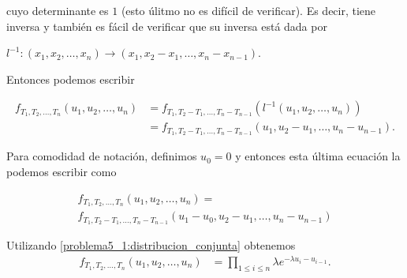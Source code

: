 cuyo determinante es $1$ (esto úlitmo no es difícil de verificar). Es decir, tiene inversa y también es fácil de verificar que 
su inversa está dada por\par $l^{-1}: (x_1, x_2, \dots, x_n) \longrightarrow (x_1, x_2-x_1, \dots, x_n - x_{n-1})$.\pn

Entonces podemos escribir

\begin{align}
    f_{T_1, T_2, \dots, T_n}(u_1, u_2, \dots, u_n)  &=  f_{T_1, T_2 - T_1, \dots, T_n - T_{n-1}}(l^{-1}(u_1, u_2, \dots, u_n))      \\
                                                    &=  f_{T_1, T_2 - T_1, \dots, T_n - T_{n-1}}(u_1, u_2-u_1, \dots, u_n - u_{n-1}).
\end{align}\pn

Para comodidad de notación, definimos $u_0 = 0$ y entonces esta última ecuación la podemos escribir como

\begin{align}
    f_{T_1, T_2, \dots, T_n}(u_1, u_2, \dots, u_n) =                                    \\  
    f_{T_1, T_2 - T_1, \dots, T_n - T_{n-1}}(u_1 - u_0, u_2-u_1, \dots, u_n - u_{n-1})
\end{align}\pn

Utilizando \eqref{problema5_1:distribucion_conjunta} obtenemos
\begin{align}
    f_{T_1, T_2, \dots, T_n}(u_1, u_2, \dots, u_n)  &= \prod_{1 \leq i \leq n} \lambda e^{-\lambda u_i - u_{i-1}}.
\end{align}\pn


